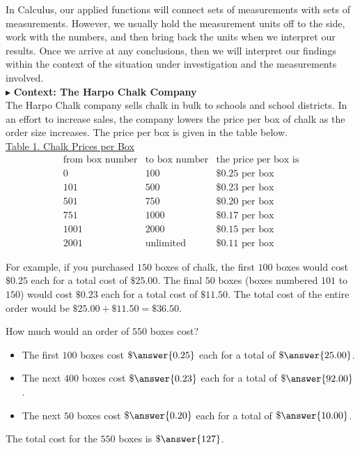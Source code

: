 \documentclass{ximera}
\begin{document}
In Calculus, our applied functions will connect sets of measurements with sets of measurements. However, we usually hold the measurement units off to the side, work with the numbers, and then bring back the units when we interpret our results.  Once we arrive at any conclusions, then we will interpret our findings within the context of the situation under investigation and the measurements involved. \\




$\blacktriangleright$ \textbf{Context: The Harpo Chalk Company} \\

The Harpo Chalk company sells chalk in bulk to schools and school districts. In an effort to increase sales, the company lowers the price per box of chalk as the order size increases.  The price per box is given in the table below. \\




\underline{Table 1. Chalk Prices per Box}
\[
\begin{array}{lll}
\text{from box number} & \text{to box number}  & \text{the price per box is} \\
0 &  100 &  \$0.25 \text{ per box}   \\
101 &  500 &  \$0.23 \text{ per box}   \\
501 &  750 &  \$0.20 \text{ per box}   \\
751 &  1000 &  \$0.17 \text{ per box}   \\
1001 &  2000 &  \$0.15 \text{ per box}   \\
2001 &  \text{unlimited} &  \$0.11 \text{ per box}   
\end{array}
\]




For example, if you purchased $150$ boxes of chalk, the first $100$ boxes would cost $\$0.25$ each for a total cost of $\$25.00$.  The final $50$ boxes (boxes numbered $101$ to $150$) would cost $\$0.23$ each for a total cost of $\$11.50$.  The total cost of the entire order would be $\$25.00 + \$11.50 = \$36.50$.


\begin{question}
How much would an order of $550$ boxes cost?

\begin{explanation}

\begin{itemize}
\item The first $100$ boxes cost $\$\answer{0.25}$ each for a total of $\$\answer{25.00}$.
\item The next $400$ boxes cost $\$\answer{0.23}$ each for a total of $\$\answer{92.00}$.
\item The next $50$ boxes cost $\$\answer{0.20}$ each for a total of $\$\answer{10.00}$.
\end{itemize}

The total cost for the $550$ boxes is $\$\answer{127}$.
\end{explanation}
\end{question}
\end{document}
